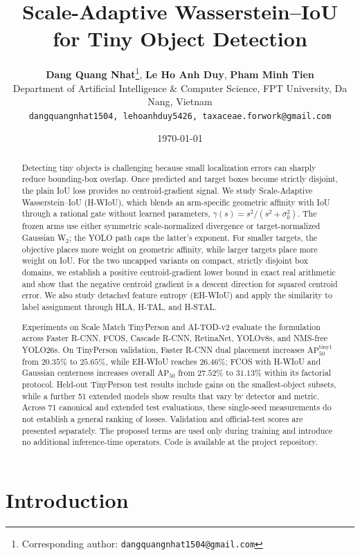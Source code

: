 \documentclass[11pt,a4paper]{article}
\title{\LARGE \bf Scale-Adaptive Wasserstein--IoU for Tiny Object Detection}
\author{
  \textbf{Dang Quang Nhat}\thanks{Corresponding author: \texttt{dangquangnhat1504@gmail.com}}, \quad
  \textbf{Le Ho Anh Duy}, \quad
  \textbf{Pham Minh Tien}\\[0.4em]
  \normalsize Department of Artificial Intelligence \& Computer Science, FPT University, Da Nang, Vietnam\\
  \normalsize \texttt{\symbol{123}dangquangnhat1504, lehoanhduy5426, taxaceae.forwork\symbol{125}@gmail.com}
}
\date{\today}
\begin{document}
\maketitle

\begin{abstract}
Detecting tiny objects is challenging because small localization errors can sharply reduce bounding-box overlap. Once predicted and target boxes become strictly disjoint, the plain IoU loss provides no centroid-gradient signal. We study Scale-Adaptive Wasserstein--IoU (H-WIoU), which blends an arm-specific geometric affinity with IoU through a rational gate without learned parameters, $\gamma(s)=s^2/(s^2+\sigma_0^2)$. The frozen arms use either symmetric scale-normalized divergence or target-normalized Gaussian W$_2$; the YOLO path caps the latter's exponent. For smaller targets, the objective places more weight on geometric affinity, while larger targets place more weight on IoU. For the two uncapped variants on compact, strictly disjoint box domains, we establish a positive centroid-gradient lower bound in exact real arithmetic and show that the negative centroid gradient is a descent direction for squared centroid error. We also study detached feature entropy (EH-WIoU) and apply the similarity to label assignment through HLA, H-TAL, and H-STAL.

Experiments on Scale Match TinyPerson and AI-TOD-v2 evaluate the formulation across Faster R-CNN, FCOS, Cascade R-CNN, RetinaNet, YOLOv8s, and NMS-free YOLO26s. On TinyPerson validation, Faster R-CNN dual placement increases $\mathrm{AP}_{50}^{\mathrm{tiny1}}$ from $20.35\%$ to $25.65\%$, while EH-WIoU reaches $26.46\%$; FCOS with H-WIoU and Gaussian centerness increases overall $\mathrm{AP}_{50}$ from $27.52\%$ to $31.13\%$ within its factorial protocol. Held-out TinyPerson test results include gains on the smallest-object subsets, while a further 51 extended models show results that vary by detector and metric. Across 71 canonical and extended test evaluations, these single-seed measurements do not establish a general ranking of losses. Validation and official-test scores are presented separately. The proposed terms are used only during training and introduce no additional inference-time operators. Code is available at the project repository.
\end{abstract}

\section{Introduction}
\end{document}
